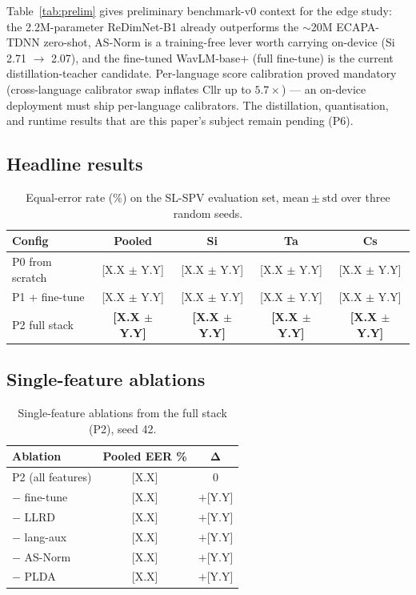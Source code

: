 \documentclass[11pt,a4paper]{article}
\begin{document}
Table~\ref{tab:prelim} gives preliminary benchmark-v0 context for the
edge study: the 2.2M-parameter ReDimNet-B1 already outperforms the
$\sim$20M ECAPA-TDNN zero-shot, AS-Norm is a training-free lever worth
carrying on-device (Si 2.71 $\to$ 2.07), and the fine-tuned
WavLM-base+ (full fine-tune) is the current distillation-teacher
candidate. Per-language score calibration proved mandatory
(cross-language calibrator swap inflates Cllr up to $5.7\times$) ---
an on-device deployment must ship per-language calibrators. The
distillation, quantisation, and runtime results that are this paper's
subject remain pending (P6).

\subsection{Headline results}

\begin{table}[t]
\centering
\caption{Equal-error rate (\%) on the SL-SPV evaluation set,
$\mathrm{mean} \pm \mathrm{std}$ over three random seeds.}
\label{tab:headline}
\begin{tabular}{lcccc}
\toprule
\textbf{Config} & \textbf{Pooled} & \textbf{Si} & \textbf{Ta} & \textbf{Cs} \\
\midrule
P0 from scratch   & [X.X $\pm$ Y.Y] & [X.X $\pm$ Y.Y] & [X.X $\pm$ Y.Y] & [X.X $\pm$ Y.Y] \\
P1 + fine-tune    & [X.X $\pm$ Y.Y] & [X.X $\pm$ Y.Y] & [X.X $\pm$ Y.Y] & [X.X $\pm$ Y.Y] \\
P2 full stack     & \textbf{[X.X $\pm$ Y.Y]} & \textbf{[X.X $\pm$ Y.Y]}
                  & \textbf{[X.X $\pm$ Y.Y]} & \textbf{[X.X $\pm$ Y.Y]} \\
\bottomrule
\end{tabular}
\end{table}

\subsection{Single-feature ablations}

\begin{table}[t]
\centering
\caption{Single-feature ablations from the full stack (P2), seed 42.}
\label{tab:ablation}
\begin{tabular}{lcc}
\toprule
\textbf{Ablation} & \textbf{Pooled EER \%} & $\boldsymbol{\Delta}$ \\
\midrule
P2 (all features)   & [X.X] & 0 \\
$-$ fine-tune       & [X.X] & $+$[Y.Y] \\
$-$ LLRD            & [X.X] & $+$[Y.Y] \\
$-$ lang-aux        & [X.X] & $+$[Y.Y] \\
$-$ AS-Norm         & [X.X] & $+$[Y.Y] \\
$-$ PLDA            & [X.X] & $+$[Y.Y] \\
\bottomrule
\end{tabular}
\end{table}
\end{document}
